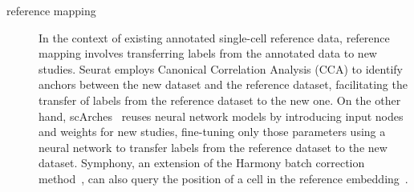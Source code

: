 \begin{description}
	\item[reference mapping]
	In the context of existing annotated single-cell reference data, reference mapping involves transferring labels from the annotated data to new studies. Seurat employs Canonical Correlation Analysis (CCA) to identify anchors between the new dataset and the reference dataset, facilitating the transfer of labels from the reference dataset to the new one. On the other hand, scArches~\citep{lotfollahi2022scarches} reuses neural network models by introducing input nodes and weights for new studies, fine-tuning only those parameters using a neural network to transfer labels from the reference dataset to the new dataset. Symphony, an extension of the Harmony batch correction method~\citep{korsunsky2019harmony}, can also query the position of a cell in the reference embedding~\citep{kang2021symphony}.

\end{description}

